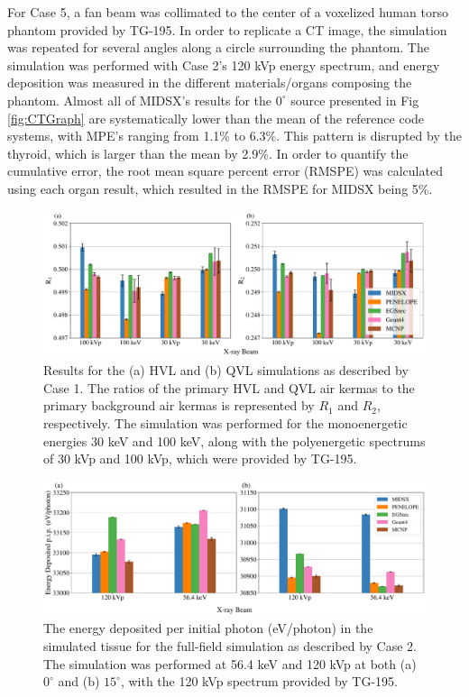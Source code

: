 \par For Case 5, a fan beam was collimated to the center of a voxelized human torso phantom provided by TG-195. In order to replicate a CT image, the simulation was repeated for several angles along a circle surrounding the phantom. The simulation was performed with Case 2's 120 kVp energy spectrum, and energy deposition was measured in the different materials/organs composing the phantom. Almost all of MIDSX's results for the $0^\circ$ source presented in Fig \ref{fig:CTGraph} are systematically lower than the mean of the reference code systems, with MPE's ranging from 1.1\% to 6.3\%. This pattern is disrupted by the thyroid, which is larger than the mean by 2.9\%. In order to quantify the cumulative error, the root mean square percent error (RMSPE) was calculated using each organ result, which resulted in the RMSPE for MIDSX being 5\%. 

\par 


\begin{figure}[htbp!]
    \centering
	\includegraphics[width=1.0\textwidth]{../figures/HVL_and_QVL_paper_ready.pdf}
	\caption{Results for the (a) HVL and (b) QVL simulations as described by Case 1. The ratios of the primary HVL and QVL air kermas to the primary background air kermas is represented by $R_1$ and $R_2$, respectively. The simulation was performed for the monoenergetic energies 30 keV and 100 keV, along with the polyenergetic spectrums of 30 kVp and 100 kVp, which were provided by TG-195.}
	\label{fig:HVLGraph}
\end{figure}

\begin{figure}[H]
    \centering
	\includegraphics[width=1.0\textwidth]{../figures/radiography_body_dep_paper_ready.pdf}
	\caption{The energy deposited per initial photon (eV/photon) in the simulated tissue for the full-field simulation as described by Case 2. The simulation was performed at 56.4 keV and 120 kVp at both (a) $0^\circ$ and (b) $15^\circ$, with the 120 kVp spectrum provided by TG-195.}
 	\label{fig:BDGraph}
\end{figure}


